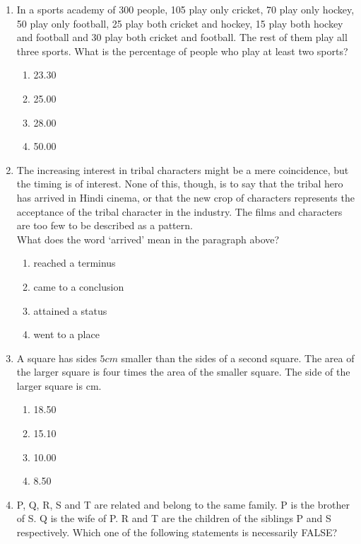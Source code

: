 \documentclass[journal,12pt,onecolumn]{IEEEtran}
\theoremstyle{remark}
\begin{document}
\begin{enumerate}
\item In a sports academy of 300 people, 105 play only cricket, 70 play only hockey, 50 play only football, 25 play both cricket and hockey, 15 play both hockey and football and 30 play both cricket and football. The rest of them play all three sports. What is the percentage of people who play at least two sports?

\hfill{}
\begin{enumerate}
\item 23.30
\item 25.00
\item 28.00
\item 50.00
\end{enumerate}

\item The increasing interest in tribal characters might be a mere coincidence, but the timing is of interest. None of this, though, is to say that the tribal hero has arrived in Hindi cinema, or that the new crop of characters represents the acceptance of the tribal character in the industry. The films and characters are too few to be described as a pattern.\\
What does the word `arrived' mean in the paragraph above?

\hfill{}
\begin{enumerate}
\item reached a terminus
\item came to a conclusion
\item attained a status
\item went to a place
\end{enumerate}

\item A square has sides $5cm$ smaller than the sides of a second square. The area of the larger square is four times the area of the smaller square. The side of the larger square is \underline{\hspace{2cm}} cm.

\hfill{}
\begin{enumerate}
\item 18.50
\item 15.10
\item 10.00
\item 8.50
\end{enumerate}

\item P, Q, R, S and T are related and belong to the same family. P is the brother of S. Q is the wife of P. R and T are the children of the siblings P and S respectively. Which one of the following statements is necessarily FALSE?


\end{enumerate}
\end{document}
